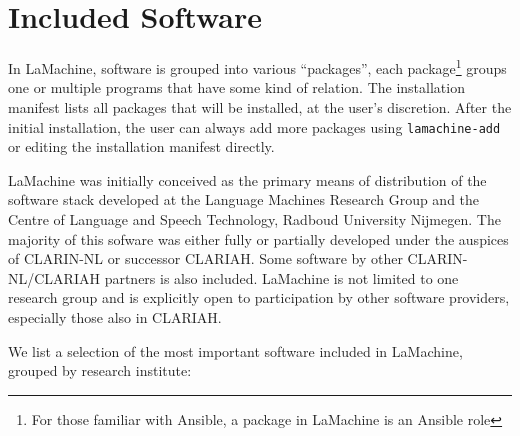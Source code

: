 \documentclass[a4paper,11pt]{article}
\begin{document}
\section{ Included Software}

In LaMachine, software is grouped into various ``packages'', each package\footnote{For those familiar with
Ansible, a package in LaMachine is an Ansible role} groups one or multiple programs that have some kind of relation. The
installation manifest lists all packages that will be installed, at the user's discretion. After the initial
installation, the user can always add more packages using \texttt{lamachine-add} or editing the installation manifest directly.

LaMachine was initially conceived as the primary means of distribution of the software stack developed at the Language
Machines Research Group and the Centre of
Language and Speech Technology, Radboud University Nijmegen. The majority of this sofware was either fully or partially developed under the auspices of CLARIN-NL or successor
CLARIAH. Some software by other CLARIN-NL/CLARIAH partners is also included. LaMachine is not limited to one research
group and is explicitly open to participation by other software providers, especially those
also in CLARIAH.

We list a selection of the most important software included in LaMachine, grouped by research institute:
\end{document}
